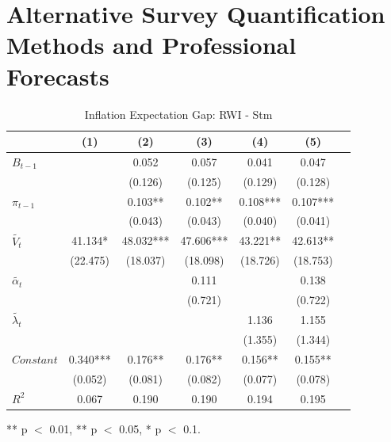 \documentclass[review]{elsarticle}
\begin{document}
\section{Alternative Survey Quantification Methods and Professional Forecasts}

\begin{table}[!ht]
\centering 
  \caption{Inflation Expectation Gap: RWI - Stm} 
  \label{tab:Inflation Expectation Gap}
\begin{tabular}{l*{6}{c}}   
\toprule
                    & (1) & (2) & (3) & (4) & (5) \\
\midrule
$B_{t-1}$           &     & 0.052 & 0.057 & 0.041 & 0.047 \\
                    &     & (0.126) & (0.125) & (0.129) & (0.128) \\
$\pi_{t-1}$         &     & 0.103** & 0.102** & 0.108*** & 0.107*** \\
                    &     & (0.043) & (0.043) & (0.040) & (0.041) \\
$\tilde{V_t}$       & 41.134* & 48.032*** & 47.606*** & 43.221** & 42.613** \\
                    & (22.475) & (18.037) & (18.098) & (18.726) & (18.753) \\
$\tilde{\alpha_t}$  &     &     & 0.111 &     & 0.138 \\
                    &     &     & (0.721) &     & (0.722) \\
$\tilde{\lambda_t}$ &     &     &     & 1.136 & 1.155 \\
                    &     &     &     & (1.355) & (1.344) \\
$Constant$          & 0.340*** & 0.176** & 0.176** & 0.156** & 0.155** \\
                    & (0.052) & (0.081) & (0.082) & (0.077) & (0.078) \\
\midrule
$R^2$               & 0.067 & 0.190 & 0.190 & 0.194 & 0.195 \\
\bottomrule
\end{tabular} 
\parbox{0.8\textwidth}{\centering \small *** p $<$ 0.01, ** p $<$ 0.05, * p $<$ 0.1.}
\end{table}
\end{document}
